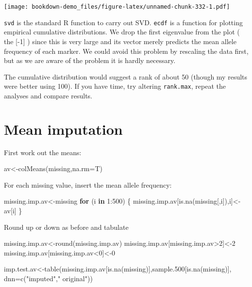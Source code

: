 \documentclass[
]{book}
\newenvironment{Shaded}{\begin{snugshade}}{\end{snugshade}}
\newcommand{\AttributeTok}[1]{\textcolor[rgb]{0.77,0.63,0.00}{#1}}
\newcommand{\ControlFlowTok}[1]{\textcolor[rgb]{0.13,0.29,0.53}{\textbf{#1}}}
\newcommand{\DecValTok}[1]{\textcolor[rgb]{0.00,0.00,0.81}{#1}}
\newcommand{\FloatTok}[1]{\textcolor[rgb]{0.00,0.00,0.81}{#1}}
\newcommand{\FunctionTok}[1]{\textcolor[rgb]{0.00,0.00,0.00}{#1}}
\newcommand{\NormalTok}[1]{#1}
\newcommand{\OtherTok}[1]{\textcolor[rgb]{0.56,0.35,0.01}{#1}}
\newcommand{\SpecialCharTok}[1]{\textcolor[rgb]{0.00,0.00,0.00}{#1}}
\newcommand{\StringTok}[1]{\textcolor[rgb]{0.31,0.60,0.02}{#1}}
\begin{document}
\texttt{[image: bookdown-demo\_files/figure-latex/unnamed-chunk-332-1.pdf]}

\texttt{svd} is the standard R function to carry out SVD. \texttt{ecdf} is a function for plotting empirical cumulative distributions. We drop the first eigenvalue from the plot ( the {[}-1{]} ) since this is very large and its vector merely predicts the mean allele frequency of each marker. We could avoid this problem by rescaling the data first, but as we are aware of the problem it is hardly necessary.

The cumulative distribution would suggest a rank of about 50 (though my results were better using 100). If you have time, try altering \texttt{rank.max}, repeat the analyses and compare results.

\hypertarget{mean-imputation}{%
\section{Mean imputation}\label{mean-imputation}}

First work out the means:

\begin{Shaded}
\begin{Highlighting}[]
\NormalTok{av}\OtherTok{\textless{}{-}}\FunctionTok{colMeans}\NormalTok{(missing,}\AttributeTok{na.rm=}\NormalTok{T)   }
\end{Highlighting}
\end{Shaded}

For each missing value, insert the mean allele frequency:

\begin{Shaded}
\begin{Highlighting}[]
\NormalTok{missing.imp.av}\OtherTok{\textless{}{-}}\NormalTok{missing }
\ControlFlowTok{for}\NormalTok{ (i }\ControlFlowTok{in} \DecValTok{1}\SpecialCharTok{:}\DecValTok{500}\NormalTok{) \{}
\NormalTok{  missing.imp.av[}\FunctionTok{is.na}\NormalTok{(missing[,i]),i]}\OtherTok{\textless{}{-}}\NormalTok{av[i]   }
\NormalTok{\} }
\end{Highlighting}
\end{Shaded}

Round up or down as before and tabulate

\begin{Shaded}
\begin{Highlighting}[]
\NormalTok{missing.imp.av}\OtherTok{\textless{}{-}}\FunctionTok{round}\NormalTok{(missing.imp.av)}
\NormalTok{missing.imp.av[missing.imp.av}\SpecialCharTok{\textgreater{}}\DecValTok{2}\NormalTok{]}\OtherTok{\textless{}{-}}\DecValTok{2}
\NormalTok{missing.imp.av[missing.imp.av}\SpecialCharTok{\textless{}}\DecValTok{0}\NormalTok{]}\OtherTok{\textless{}{-}}\DecValTok{0}

\NormalTok{imp.test.av}\OtherTok{\textless{}{-}}\FunctionTok{table}\NormalTok{(missing.imp.av[}\FunctionTok{is.na}\NormalTok{(missing)],sample}\FloatTok{.500}\NormalTok{[}\FunctionTok{is.na}\NormalTok{(missing)],}
                   \AttributeTok{dnn=}\FunctionTok{c}\NormalTok{(}\StringTok{"imputed"}\NormalTok{,}\StringTok{"       original"}\NormalTok{))}
\end{Highlighting}
\end{Shaded}
\end{document}
